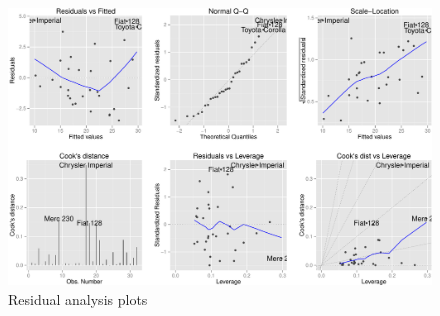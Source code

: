 \documentclass[]{article}
\begin{document}
\begin{figure}[htbp]
\centering
\includegraphics{Regression_Models_Project_files/figure-latex/residuals_plot-1.pdf}
\caption{Residual analysis plots}
\end{figure}
\end{document}

